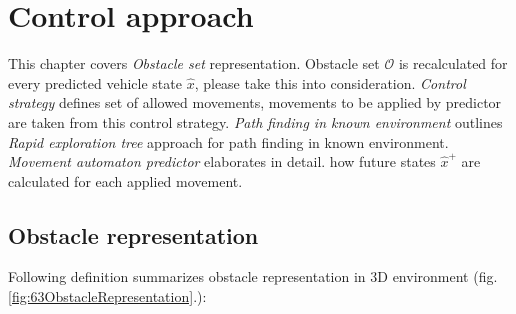 \chapter{Control approach}\label{ch:controlapproach3D}
\noindent This chapter covers \textit{Obstacle set} representation. Obstacle set $\mathscr{O}$ is recalculated for every predicted vehicle state $\hat{x}$, please take this into consideration. \textit{Control strategy} defines set of allowed movements, movements to be applied by predictor are taken from this control strategy. \textit{Path finding in known environment} outlines \textit{Rapid exploration tree} approach for path finding in known environment. \textit{Movement automaton predictor} elaborates in detail. how future states $\hat{x}^+$ are calculated for each applied movement.

\section{Obstacle representation}\label{s:3dObstacleRepresentationSimplistic}
\noindent Following definition summarizes obstacle representation in 3D environment (fig. \ref{fig:63ObstacleRepresentation}.):
